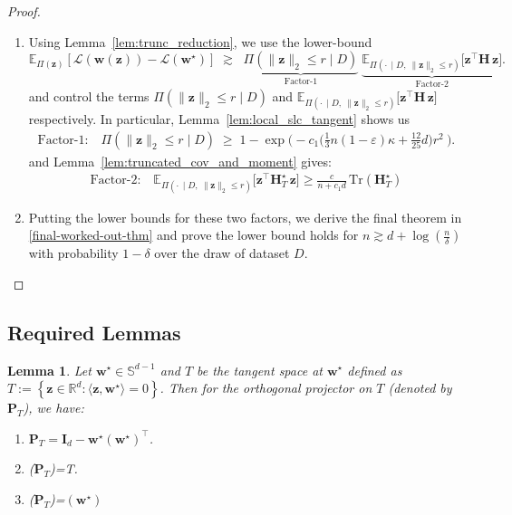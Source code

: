 \documentclass{article}
\theoremstyle{plain}
\newtheorem{lemma}[theorem]{Lemma}
\theoremstyle{definition}
\theoremstyle{remark}
\begin{document}
{\begin{proof}
\begin{enumerate}
 \begin{align}
\frac{1}{m}\mathbf I_T\,\succeq\nabla^2 V(\mathbf z) \;\succeq\; \frac{1}{M}\,\mathbf I_T .
\end{align}
    \item Using Lemma~\ref{lem:trunc_reduction}, we use the lower-bound $$
\mathbb E_{\Pi(\mathbf z)}[ \mathcal{L}(\mathbf w(\mathbf z))-\mathcal L(\mathbf w^\star)]
\;\gtrsim\;
\;
\underbrace{\Pi(\|\mathbf z\|_2\le r\mid D)}_{\text{Factor-1}}\;
\underbrace{\mathbb E_{\Pi(\cdot\,\mid D,\ \|\mathbf z\|_2\le r)}\!\big[\mathbf z^\top \mathbf H\,\mathbf z\big]}_{\text{Factor-2}}.
$$ and control the terms $\Pi(\|\mathbf z\|_2\le r\mid D)$ and $\mathbb E_{\Pi(\cdot\,\mid D,\ \|\mathbf z\|_2\le r)}\!\big[\mathbf z^\top \mathbf H\,\mathbf z\big]$ respectively. In particular, Lemma~\ref{lem:local_slc_tangent} shows us
\begin{align}
\text{Factor-1:} \quad  \Pi(\|\mathbf z\|_2\le r\mid D)
\;\ge\;
1-
\exp\!\Bigg(
-c_1\Big(\tfrac{1}{3}n(1-\varepsilon)\kappa+\tfrac{12}{25}d\Big)
r^2\
\Bigg).
\end{align}
and Lemma~\ref{lem:truncated_cov_and_moment} gives:
\begin{align}
  \text{Factor-2:} \quad   \mathbb E_{\Pi(\cdot\,\mid D,\ \|\mathbf z\|_2\le r)}\!\big[\mathbf z^\top \mathbf H_T^\star\,\mathbf z\big] \geq \frac{c}{n+c_1 d}\,\text{Tr}(\mathbf H_T^\star)
\end{align}

\item Putting the lower bounds for these two factors, we derive the final theorem in \ref{final-worked-out-thm} and prove the lower bound holds for $n\gtrsim d+  \log({\frac{n}{\delta}})$ with probability $1-\delta$ over the draw of dataset $D$. 
\end{enumerate}
    
\end{proof}

\subsection{Required Lemmas}
\begin{lemma}
\label{lem:tangent_projector}
Let $\mathbf{w}^\star\in\mathbb{S}^{d-1}$ and $T$ be the tangent space at $\mathbf{w}^\star$ defined as $T := \left\{ \mathbf{z}\in\mathbb{R}^d : \langle \mathbf{z}, \mathbf{w}^\star \rangle = 0 \right\}$. 
Then for the orthogonal projector on $T$ (denoted by $\mathbf{P}_T$), we have:
\begin{center}
    \begin{enumerate}
    \item $\mathbf{P}_T = \mathbf{I}_d - \mathbf{w}^\star (\mathbf{w}^\star)^{\top}$.
    \item  \text{Range}($\mathbf{P}_T$)=T.
    \item {}($\mathbf{P}_T$)=$(\mathbf{w}^{\star})$
\end{enumerate}  
\end{center}
\end{lemma}

}
\end{document}
